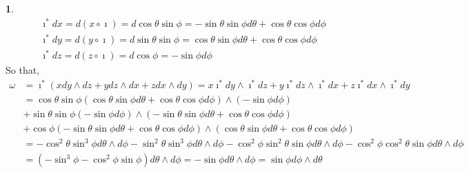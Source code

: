 \documentclass[10.5pt]{article}
\theoremstyle{definition}
\newtheorem{pb}{}
\newcommand{\z}{\imath}
\begin{document}
\begin{pb}
\begin{align*}
            &\z^* dx = d(x \circ \z) = d\cos\theta\sin\phi = -\sin\theta\sin\phi d\theta + \cos\theta \cos\phi d\phi\\
            &\z^* dy = d(y \circ \z) = d\sin\theta\sin\phi = \cos\theta\sin\phi d\theta + \cos\theta \cos\phi d\phi \\
            &\z^* dz = d(z \circ \z) = d\cos\phi = -\sin\phi d\phi
        \end{align*}
        So that,
        \begin{align*}
            \omega &= \z^*(xdy\wedge dz + ydz\wedge dx + zdx \wedge dy)
            = x\z^*dy\wedge \z^*dz + y\z^*dz\wedge \z^*dx + z\z^*dx \wedge \z^*dy \\
            &= \cos\theta\sin\phi(\cos\theta\sin\phi d\theta + \cos\theta \cos\phi d\phi) \wedge (-\sin\phi d\phi) \\
            &+ \sin\theta\sin\phi (-\sin\phi d\phi) \wedge (-\sin\theta\sin\phi d\theta + \cos\theta \cos\phi d\phi) \\
            &+ \cos\phi (-\sin\theta\sin\phi d\theta + \cos\theta \cos\phi d\phi) \wedge (\cos\theta\sin\phi d\theta + \cos\theta \cos\phi d\phi) \\
            &= -\cos^2\theta\sin^3\phi d\theta \wedge d\phi
            - \sin^2\theta\sin^3\phi d\theta \wedge d\phi - \cos^2\phi\sin^2\theta\sin\phi d\theta \wedge d\phi - \cos^2\phi \cos^2\theta \sin\phi d\theta \wedge d\phi \\
            &= (-\sin^3\phi - \cos^2\phi\sin\phi)d\theta \wedge d\phi = -\sin\phi d\theta \wedge d\phi = \sin\phi d\phi \wedge d\theta
        \end{align*}


\end{pb}
\end{document}
